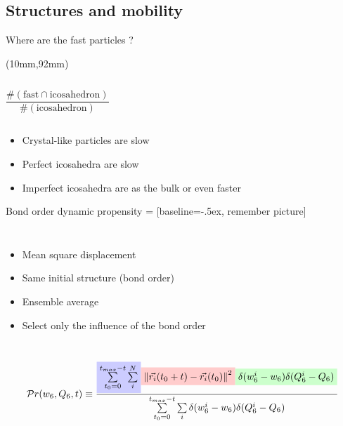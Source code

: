 \subsection{Structures and mobility}

\begin{frame}{Where are the fast particles ?}
	\begin{textblock*}{0.6\textwidth}(10mm,92mm)
		\simplephasediagram{}
	\end{textblock*}
	\begin{columns}
	\resizebox{\columnwidth}{!}{}
	\[ \frac{\#(\text{fast}\cap\text{icosahedron})}{\#(\text{icosahedron})} \]
	\end{columns}
	\begin{itemize}
		\item Crystal-like particles are slow
		\item Perfect icosahedra are slow
		\item Imperfect icosahedra are as the bulk or even faster
	\end{itemize}
\end{frame}

\begin{frame}{Bond order dynamic propensity}
	 = [baseline=-.5ex, remember picture]
	\begin{columns}
	\column{0.5\textwidth}
	\centering{\resizebox{\columnwidth}{!}{}}
	\column{0.5\textwidth}
	\begin{itemize}
		\item\colorbox{red!20}{Mean square displacement}
		\item\colorbox{green!20}{Same initial structure} (bond order)
		\item\colorbox{blue!20}{Ensemble average}
		\item Select only the influence of the bond order
	\end{itemize}
	\end{columns}
	\begin{equation*}
	\mathcal{P}r(w_6, Q_6, t) \equiv \frac{
		\colorbox{blue!20}{$\sum\limits_{t_0=0}^{t_{max}-t} \sum\limits_i^N$}
		{
			\colorbox{red!20}{$\left\|\vec{r_i}(t_0+t)-\vec{r_i}(t_0)\right\|^2$}
            \colorbox{green!20}{$\delta(w_6^i-w_6) \delta(Q_6^i-Q_6)$}
		}
	}{
		\sum\limits_{t_0=0}^{t_{max}-t} \sum\limits_i{ \delta(w_6^i-w_6) \delta(Q_6^i-Q_6)}
	}
	\end{equation*}
\end{frame}

